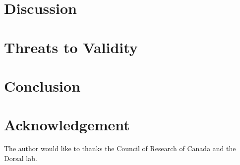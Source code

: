 \section{Discussion}
\label{sec:results}



\section{Threats to Validity}
\label{sec:validity}


\section{Conclusion}
\label{sec:conclusion}


\section{Acknowledgement}
\label{sec:acknowledgement}
The author would like to thanks the Council of Research of Canada and the Dorsal lab. 

 
